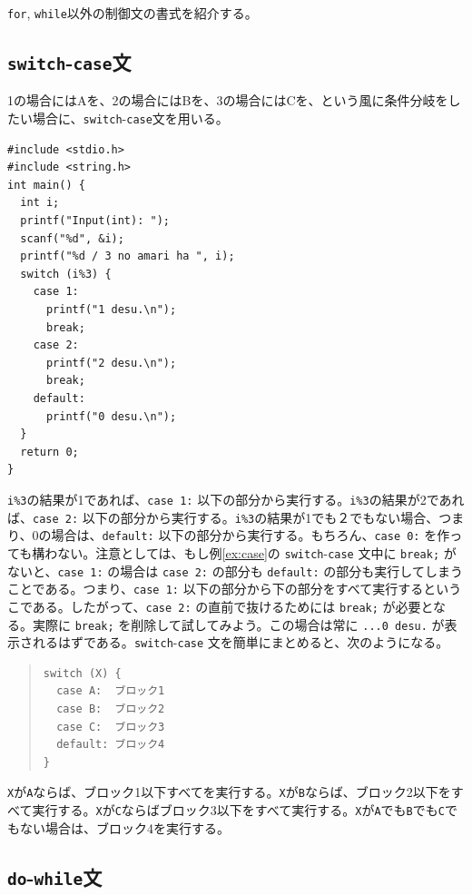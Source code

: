  {\tt for}, {\tt while}以外の制御文の書式を紹介する。

\subsection{{\tt switch}-{\tt case}文}

1の場合にはAを、2の場合にはBを、3の場合にはCを、という風に条件分岐をしたい場合に、\verb|switch|-\verb|case|文を用いる。
\begin{reidai}\label{ex:case}
\begin{verbatim}
#include <stdio.h>
#include <string.h>
int main() {
  int i;
  printf("Input(int): ");
  scanf("%d", &i);
  printf("%d / 3 no amari ha ", i);
  switch (i%3) {
    case 1:
      printf("1 desu.\n");
      break;
    case 2:
      printf("2 desu.\n");
      break;
    default:
      printf("0 desu.\n");
  }
  return 0;
}
\end{verbatim}
\end{reidai} \noindent
\verb|i%3|の結果が1であれば、\verb|case 1:| 以下の部分から実行する。\verb|i%3|の結果が2であれば、\verb|case 2:| 以下の部分から実行する。\verb|i%3|の結果が1でも２でもない場合、つまり、0の場合は、\verb|default:| 以下の部分から実行する。もちろん、\verb|case 0:| を作っても構わない。注意としては、もし例\ref{ex:case}の \verb|switch|-\verb|case| 文中に \verb|break;| がないと、\verb|case 1:| の場合は \verb|case 2:| の部分も \verb|default:| の部分も実行してしまうことである。つまり、\verb|case 1:| 以下の部分から下の部分をすべて実行するというこである。したがって、\verb|case 2:| の直前で抜けるためには \verb|break;| が必要となる。実際に \verb|break;| を削除して試してみよう。この場合は常に \verb|...0 desu.| が表示されるはずである。\verb|switch|-\verb|case| 文を簡単にまとめると、次のようになる。
\begin{quote}
\begin{verbatim}
switch (X) {
  case A:  ブロック1
  case B:  ブロック2
  case C:  ブロック3
  default: ブロック4
}
\end{verbatim}
\end{quote}
\verb|X|が\verb|A|ならば、ブロック1以下すべてを実行する。\verb|X|が\verb|B|ならば、ブロック2以下をすべて実行する。\verb|X|が\verb|C|ならばブロック3以下をすべて実行する。\verb|X|が\verb|A|でも\verb|B|でも\verb|C|でもない場合は、ブロック4を実行する。

\subsection{{\tt do}-{\tt while}文}


